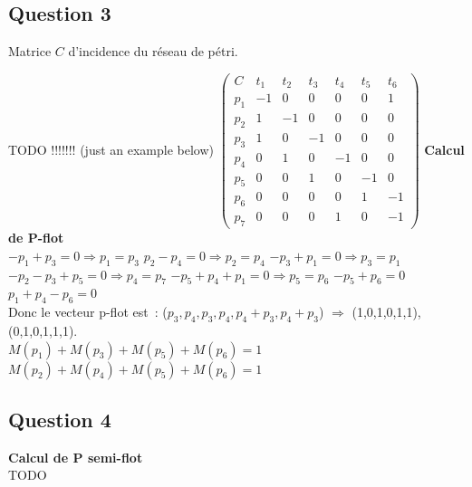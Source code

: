 \subsection*{Question 3}

Matrice $C$ d'incidence du réseau de pétri.

TODO !!!!!!! (just an example below)
 $ \begin{pmatrix}
C&t_1&t_2&t_3&t_4&t_5&t_6 \\
p_1& -1&0&0&0&0&1 \\
p_2&1&-1&0&0&0&0 \\
p_3&1&0&-1&0&0&0 \\
p_4&0&1&0&-1&0&0 \\
p_5&0&0&1&0&-1&0 \\
p_6&0&0&0&0&1&-1 \\
p_7&0&0&0&1&0&-1 
\end{pmatrix}$
\textbf{Calcul de P-flot}\\
$-p_1 + p_3=0 \Rightarrow p_1=p_3$
$p_2 - p_4=0 \Rightarrow p_2=p_4$
$-p_3 + p_1=0 \Rightarrow p_3=p_1$
$-p_2 - p_3 + p_5=0 \Rightarrow p_4=p_7$
$-p_5 + p_4 + p_1=0 \Rightarrow p_5=p_6$
$-p_5 + p_6=0$
$ p_1 + p_4 - p_6=0$\\
Donc le vecteur p-flot est~: ($p_3,p_4,p_3,p_4,p_4 + p_3,p_4 + p_3$) $\Rightarrow$ (1,0,1,0,1,1),(0,1,0,1,1,1).\\
$M(p_1)+M(p_3)+M(p_5)+M(p_6)=1$
$M(p_2)+M(p_4)+M(p_5)+M(p_6)=1$
\subsection*{Question 4}
\textbf{Calcul de P semi-flot}\\


TODO

